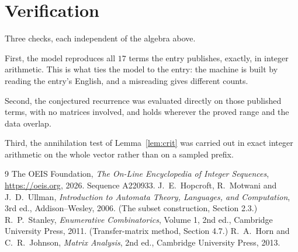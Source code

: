 \documentclass[11pt,a4paper]{article}
\theoremstyle{plain}
\theoremstyle{definition}
\begin{document}
\section{Verification}

Three checks, each independent of the algebra above.

First, the model reproduces all $17$ terms the entry publishes, exactly, in integer
arithmetic. This is what ties the model to the entry: the machine is built by reading the
entry's English, and a misreading gives different counts.

Second, the conjectured recurrence was evaluated directly on those published terms, with no
matrices involved, and holds wherever the proved range and the data overlap.

Third, the annihilation test of Lemma~\ref{lem:crit} was carried out in exact integer
arithmetic on the whole vector rather than on a sampled prefix.

\begin{thebibliography}{9}
 The OEIS Foundation, \emph{The On-Line Encyclopedia of Integer
Sequences}, \url{https://oeis.org}, 2026. Sequence A220933.
 J.~E.~Hopcroft, R.~Motwani and J.~D.~Ullman, \emph{Introduction to Automata
Theory, Languages, and Computation}, 3rd ed., Addison--Wesley, 2006. (The subset
construction, Section 2.3.)
 R.~P.~Stanley, \emph{Enumerative Combinatorics}, Volume 1, 2nd ed.,
Cambridge University Press, 2011. (Transfer-matrix method, Section 4.7.)
 R.~A.~Horn and C.~R.~Johnson, \emph{Matrix Analysis}, 2nd ed., Cambridge
University Press, 2013.
\end{thebibliography}
\end{document}
